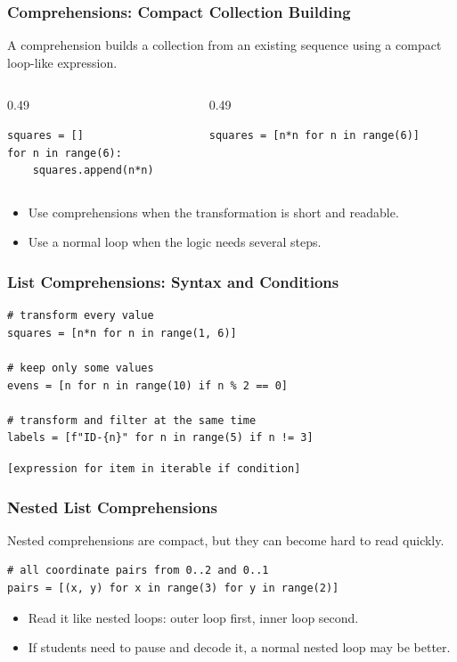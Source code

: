 \documentclass[aspectratio=169,10pt]{beamer}
\newcommand{\code}[1]{\texttt{#1}}
\newenvironment{bluebox}[1]{%
  \vspace{0.08cm}\begin{tcolorbox}[lecturebox,title={#1},fontupper=\small]%
}{\end{tcolorbox}\vspace{0.05cm}}
\begin{document}
\begin{frame}[fragile]
\frametitle{Comprehensions: Compact Collection Building}
\begin{bluebox}{Key idea}
A comprehension builds a collection from an existing sequence using a compact loop-like expression.
\end{bluebox}
\begin{columns}[T]
\begin{column}{0.49\textwidth}
\begin{lstlisting}[style=py]
squares = []
for n in range(6):
    squares.append(n*n)
\end{lstlisting}
\end{column}
\begin{column}{0.49\textwidth}
\begin{lstlisting}[style=py]
squares = [n*n for n in range(6)]
\end{lstlisting}
\end{column}
\end{columns}
\begin{itemize}
  \item Use comprehensions when the transformation is short and readable.
  \item Use a normal loop when the logic needs several steps.
\end{itemize}
\end{frame}

\begin{frame}[fragile]
\frametitle{List Comprehensions: Syntax and Conditions}
\begin{lstlisting}[style=py]
# transform every value
squares = [n*n for n in range(1, 6)]

# keep only some values
evens = [n for n in range(10) if n % 2 == 0]

# transform and filter at the same time
labels = [f"ID-{n}" for n in range(5) if n != 3]
\end{lstlisting}
\begin{bluebox}{Pattern}
\code{[expression for item in iterable if condition]}
\end{bluebox}
\end{frame}

\begin{frame}[fragile]
\frametitle{Nested List Comprehensions}
\begin{bluebox}{Use with care}
Nested comprehensions are compact, but they can become hard to read quickly.
\end{bluebox}
\begin{lstlisting}[style=py]
# all coordinate pairs from 0..2 and 0..1
pairs = [(x, y) for x in range(3) for y in range(2)]
\end{lstlisting}
\begin{itemize}
  \item Read it like nested loops: outer loop first, inner loop second.
  \item If students need to pause and decode it, a normal nested loop may be better.
\end{itemize}
\end{frame}
\end{document}
